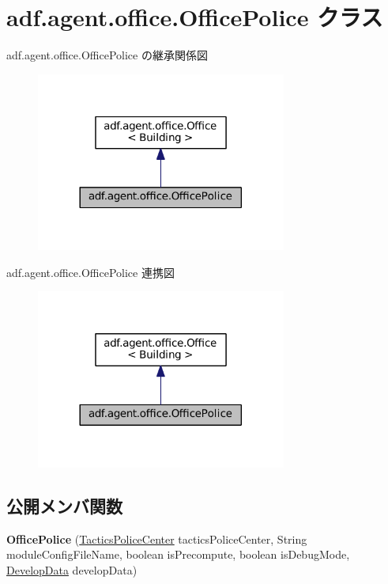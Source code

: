 \hypertarget{classadf_1_1agent_1_1office_1_1OfficePolice}{}\section{adf.\+agent.\+office.\+Office\+Police クラス}
\label{classadf_1_1agent_1_1office_1_1OfficePolice}


adf.\+agent.\+office.\+Office\+Police の継承関係図
\nopagebreak
\begin{figure}[H]
\begin{center}
\leavevmode
\includegraphics[width=233pt]{classadf_1_1agent_1_1office_1_1OfficePolice__inherit__graph}
\end{center}
\end{figure}


adf.\+agent.\+office.\+Office\+Police 連携図
\nopagebreak
\begin{figure}[H]
\begin{center}
\leavevmode
\includegraphics[width=233pt]{classadf_1_1agent_1_1office_1_1OfficePolice__coll__graph}
\end{center}
\end{figure}
\subsection*{公開メンバ関数}
\begin{DoxyCompactItemize}
\item 
\hypertarget{classadf_1_1agent_1_1office_1_1OfficePolice_a16892e4fcb4e24c014c1c2ff7e7deee3}{}\label{classadf_1_1agent_1_1office_1_1OfficePolice_a16892e4fcb4e24c014c1c2ff7e7deee3} 
{\bfseries Office\+Police} (\hyperlink{classadf_1_1component_1_1tactics_1_1center_1_1TacticsPoliceCenter}{Tactics\+Police\+Center} tactics\+Police\+Center, String module\+Config\+File\+Name, boolean is\+Precompute, boolean is\+Debug\+Mode, \hyperlink{classadf_1_1agent_1_1develop_1_1DevelopData}{Develop\+Data} develop\+Data)
\end{DoxyCompactItemize}

